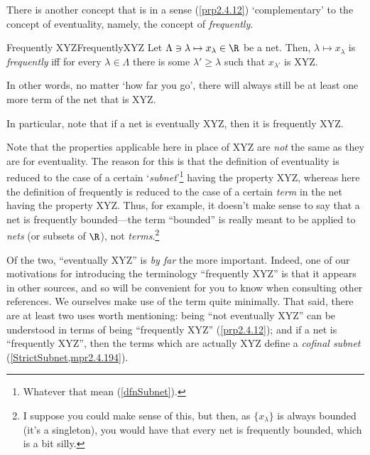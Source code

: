 There is another concept that is in a sense (\cref{prp2.4.12}) `complementary' to the concept of eventuality, namely, the concept of \emph{frequently}.
\begin{mdf}{Frequently XYZ}{FrequentlyXYZ}
Let $\Lambda \ni \lambda \mapsto x_{\lambda}\in \R$ be a net.  Then, $\lambda \mapsto x_{\lambda}$ is \emph{frequently} iff for every $\lambda \in \Lambda$ there is some $\lambda '\geq \lambda$ such that $x_{\lambda '}$ is XYZ.
\begin{rmk}
In other words, no matter `how far you go', there will always still be at least one more term of the net that is XYZ.
\end{rmk}
\begin{rmk}
In particular, note that if a net is eventually XYZ, then it is frequently XYZ.
\end{rmk}
\begin{rmk}
Note that the properties applicable here in place of XYZ are \emph{not} the same as they are for eventuality.  The reason for this is that the definition of eventuality is reduced to the case of a certain `\emph{subnet}'\footnote{Whatever that mean (\cref{dfnSubnet}).} having the property XYZ, whereas here the definition of frequently is reduced to the case of a certain \emph{term} in the net having the property XYZ.  Thus, for example, it doesn't make sense to say that a net is frequently bounded---the term ``bounded'' is really meant to be applied to \emph{nets} (or subsets of $\R$), not \emph{terms}.\footnote{I suppose you could make sense of this, but then, as $\{ x_{\lambda}\}$ is always bounded (it's a singleton), you would have that every net is frequently bounded, which is a bit silly.}
\end{rmk}
\begin{rmk}
Of the two, ``eventually XYZ'' is \emph{by far} the more important.  Indeed, one of our motivations for introducing the terminology ``frequently XYZ'' is that it appears in other sources, and so will be convenient for you to know when consulting other references.  We ourselves make use of the term quite minimally.  That said, there are at least two uses worth mentioning:  being ``not eventually XYZ'' can be understood in terms of being ``frequently XYZ'' (\cref{prp2.4.12}); and if a net is ``frequently XYZ'', then the terms which are actually XYZ define a \emph{cofinal subnet} (\cref{StrictSubnet,mpr2.4.194}).
\end{rmk}
\end{mdf}

